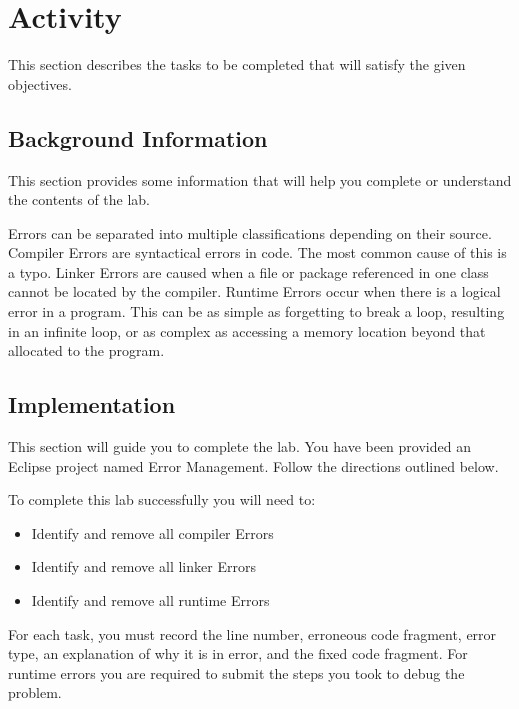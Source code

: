 \section{Activity}
This section describes the tasks to be completed that will satisfy the given objectives.
\subsection{Background Information}
This section provides some information that will help you complete or understand the contents of the lab.

Errors can be separated into multiple classifications depending on their source. 
Compiler Errors are syntactical errors in code. The most common cause of this is a typo. 
Linker Errors are caused when a file or package referenced in one class cannot be located by the compiler.
Runtime Errors occur when there is a logical error in a program. 
This can be as simple as forgetting to break a loop, resulting in an infinite loop, or as complex as accessing a memory location beyond that allocated to the program.

\subsection{Implementation}
This section will guide you to complete the lab.
You have been provided an Eclipse project named Error Management.
Follow the directions outlined below.

To complete this lab successfully you will need to:
\begin{itemize}
\item Identify and remove all compiler Errors
\item Identify and remove all linker Errors
\item Identify and remove all runtime Errors
\end{itemize}
For each task, you must record the line number, erroneous code fragment, error type, an explanation of why it is in error, and the fixed code fragment. For runtime errors you are required to submit the steps you took to debug the problem.